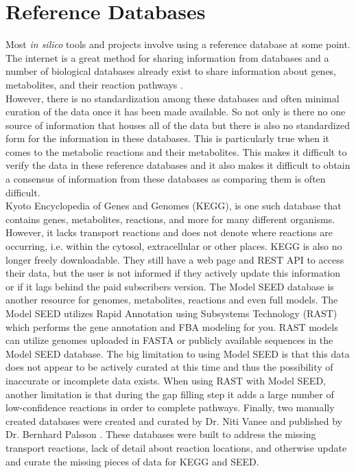 \section{Reference Databases}

\indent\indent Most \textit{in silico} tools and projects involve using a reference database at some point. The internet is a great method for sharing information from databases and a number of biological databases already exist to share information about genes, metabolites, and their reaction pathways \citep{keseler_ecocyc:_2013}.\\
\indent However, there is no standardization among these databases and often minimal curation of the data once it has been made available. So not only is there no one source of information that houses all of the data but there is also no standardized form for the information in these databases. This is particularly true when it comes to the metabolic reactions and their metabolites. This makes it difficult to verify the data in these reference databases and it also makes it difficult to obtain a consensus of information from these databases as comparing them is often difficult. \\
\indent Kyoto Encyclopedia of Genes and Genomes (KEGG), is one such database that contains genes, metabolites, reactions, and more for many different organisms\citep{ogata_kegg:_1999}. However, it lacks transport reactions and does not denote where reactions are occurring, i.e. within the cytosol, extracellular or other places.  KEGG is also no longer freely downloadable.  They still have a web page and REST API to access their data, but the user is not informed if they actively update this information or if it lags behind the paid subscribers version. The Model SEED database is another resource for genomes, metabolites, reactions and even full models\citep{overbeek_seed:_2004}. The Model SEED utilizes Rapid Annotation using Subsystems Technology (RAST) which performs the gene annotation and FBA modeling for you. RAST models can utilize genomes uploaded in FASTA or publicly available sequences in the Model SEED database.  The big limitation to using Model SEED is that this data does not appear to be actively curated at this time and thus the possibility of inaccurate or incomplete data exists. When using RAST with Model SEED, another limitation is that during the gap filling step it adds a large number of low-confidence reactions in order to complete pathways. Finally, two manually created databases were created and curated by Dr. Niti Vanee and published by Dr. Bernhard Palsson \citep{vanee_high_2013, shlomi_network-based_2008}. These databases were built to address the missing transport reactions, lack of detail about reaction locations, and otherwise update and curate the missing pieces of data for KEGG and SEED.\\
